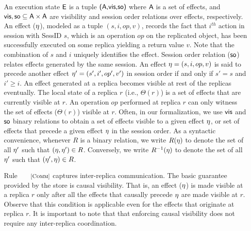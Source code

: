 An execution state ${\normalfont \textsf{E}}$ is a tuple ${\normalfont \textsf{({\normalfont \textsf{A}},\allowbreak {\normalfont \textsf{vis}},\allowbreak {\normalfont \textsf{so}})}}$ where ${\normalfont \textsf{A}}$ is a set
of effects, and ${\normalfont \textsf{vis}},{\normalfont \textsf{so}} \subseteq {\normalfont \textsf{A}} \times
{\normalfont \textsf{A}}$ are visibility and session order relations over effects,
respectively. An effect ($\eta$), modeled as a tuple $(s,i,op,v)$,
records the fact that $i^{th}$ action in session with {\sf SessID}
$s$, which is an operation $op$ on the replicated object, has been
successfully executed on some replica yielding a return value $v$.
Note that the combination of $s$ and $i$ uniquely identifies the
effect. Session order relation (${\normalfont \textsf{so}}$) relates effects generated by
the same session. An effect $\eta = (s,i,op,v)$ is said to precede
another effect $\eta' = (s',i',op',v')$ in session order if and only
if $s'=s$ and $i'\ge i$. An effect generated at a replica becomes
visible at rest of the replicas eventually. The local state of a
replica $r$ (i.e., $\Theta(r)$) is a set of effects that are currently
visible at $r$. An operation $op$ performed at replica $r$ can only
witness the set of effects ($\Theta(r)$) visible at $r$.  
Often, in our formalization, we use ${\normalfont \textsf{vis}}$ and
${\normalfont \textsf{so}}$ binary relations to obtain a set of effects visible to a given
effect $\eta$, or set of effects that precede a given effect $\eta$ in
the session order. As a syntactic convenience, whenever $R$ is a
binary relation, we write $R(\eta)$ to denote the set of all $\eta'$
such that $(\eta,\eta') \in R$.  Conversely, we write $R^{-1}(\eta)$
to denote the set of all $\eta'$ such that $(\eta',\eta) \in R$.  

Rule $\rulelabel{Comm}$ captures inter-replica communication. The
basic guarantee provided by the store is causal visibility. That is,
an effect ($\eta$) is made visible at a replica $r$ only after all
the effects that causally precede $\eta$ are made visible at $r$.
Observe that this condition is applicable even for the effects that
originate at replica $r$. 
It is important to note that that enforcing causal visibility does not
require any inter-replica coordination.

